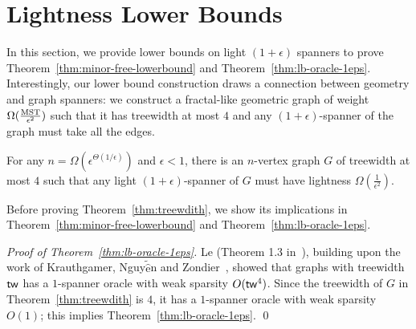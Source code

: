 
\section{Lightness Lower Bounds}\label{sec:lowerbounds}


In this section, we provide lower bounds on light $(1+\epsilon)$ spanners to prove Theorem~\ref{thm:minor-free-lowerbound} and Theorem~\ref{thm:lb-oracle-1eps}.  Interestingly, our lower bound construction draws a connection between geometry and graph spanners: we construct a fractal-like geometric graph of weight $\Omega(\frac{\mathrm{MST}}{\epsilon^2})$ such that it has treewidth at most $4$ and any $(1+\epsilon)$-spanner of the graph must take all the edges.

\begin{theorem}\label{thm:treewdith}
	For any $n = \Omega(\epsilon^{\Theta(1/\epsilon)})$ and $\epsilon < 1$, there is an $n$-vertex graph $G$ of treewidth at most $4$ such that any light $(1+\epsilon)$-spanner of $G$ must have lightness $\Omega(\frac{1}{\epsilon^2})$.
\end{theorem}

\noindent Before proving Theorem~\ref{thm:treewdith}, we show its implications in   Theorem~\ref{thm:minor-free-lowerbound} and Theorem~\ref{thm:lb-oracle-1eps}.

\begin{proof}[Proof of Theorem~\ref{thm:lb-oracle-1eps}]
	Le (Theorem 1.3 in~\cite{Le20}), building upon the work of Krauthgamer, Nguy$\tilde{\hat{\mbox{e}}}$n and Zondier~\cite{KNZ14}, showed that graphs with treewidth $\mathsf{tw}$ has a $1$-spanner oracle with weak sparsity $O(\mathsf{tw}^4)$. Since the treewidth of $G$ in Theorem~\ref{thm:treewdith} is $4$, it has a $1$-spanner oracle with weak sparsity $O(1)$; this implies Theorem~\ref{thm:lb-oracle-1eps}. \qed
\end{proof}


